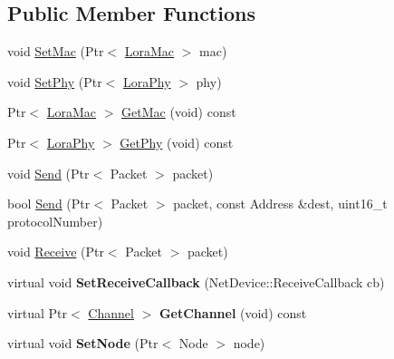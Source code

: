 \subsection*{Public Member Functions}
\begin{DoxyCompactItemize}
\item 
void \hyperlink{classns3_1_1lorawan_1_1LoraNetDevice_a6d0981324a56eaf1fe6f23b0f5b1b8b9}{Set\+Mac} (Ptr$<$ \hyperlink{classns3_1_1lorawan_1_1LoraMac}{Lora\+Mac} $>$ mac)
\item 
void \hyperlink{classns3_1_1lorawan_1_1LoraNetDevice_afa8040f91496fb57a2b09cdc56f45dab}{Set\+Phy} (Ptr$<$ \hyperlink{classns3_1_1lorawan_1_1LoraPhy}{Lora\+Phy} $>$ phy)
\item 
Ptr$<$ \hyperlink{classns3_1_1lorawan_1_1LoraMac}{Lora\+Mac} $>$ \hyperlink{classns3_1_1lorawan_1_1LoraNetDevice_a9aace1627f1c3b424c6c1ce5c2b27828}{Get\+Mac} (void) const
\item 
Ptr$<$ \hyperlink{classns3_1_1lorawan_1_1LoraPhy}{Lora\+Phy} $>$ \hyperlink{classns3_1_1lorawan_1_1LoraNetDevice_a1aa5ac843a3145c269f900612524a6f9}{Get\+Phy} (void) const
\item 
void \hyperlink{classns3_1_1lorawan_1_1LoraNetDevice_aff1ea5fcd7a14b070db6308aa0860880}{Send} (Ptr$<$ Packet $>$ packet)
\item 
bool \hyperlink{classns3_1_1lorawan_1_1LoraNetDevice_a4536a51a4f690c41f015675c827e70d3}{Send} (Ptr$<$ Packet $>$ packet, const Address \&dest, uint16\+\_\+t protocol\+Number)
\item 
void \hyperlink{classns3_1_1lorawan_1_1LoraNetDevice_add443b53ca745bff1001c1f3d08aeeef}{Receive} (Ptr$<$ Packet $>$ packet)
\item 
\mbox{\label{classns3_1_1lorawan_1_1LoraNetDevice_a67a93127527b075bddd803da3e3fc5a8}} 
virtual void {\bfseries Set\+Receive\+Callback} (Net\+Device\+::\+Receive\+Callback cb)
\item 
\mbox{\label{classns3_1_1lorawan_1_1LoraNetDevice_a00ad384f61ac72086e738068eec58226}} 
virtual Ptr$<$ \hyperlink{classChannel}{Channel} $>$ {\bfseries Get\+Channel} (void) const
\item 
\mbox{\label{classns3_1_1lorawan_1_1LoraNetDevice_a35d3af5fce2ec7a43bc59b3c20daae80}} 
virtual void {\bfseries Set\+Node} (Ptr$<$ Node $>$ node)
\item 

\end{DoxyCompactItemize}

